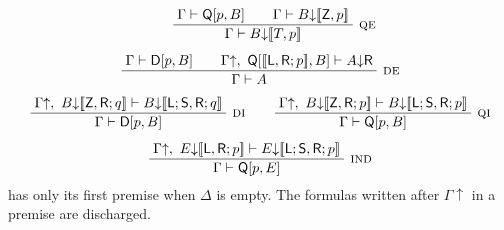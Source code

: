 \begin{definition}
\begin{gather*}
 \qquad
 \infrule{\Gamma\proves\mathsf Q[p,B]\qquad
          \Gamma\proves B{\downarrow}\llbracket\mathsf Z,p\rrbracket}
         {\Gamma\proves B{\downarrow}\llbracket T,p\rrbracket}\ \rulename{QE}
 \\[1.2ex]
 \infrule{\Gamma\proves\mathsf D[p,B]\qquad
   \Gamma{\uparrow},\ \mathsf Q[\llbracket\mathsf L,\mathsf R;p\rrbracket,B]
   \proves A{\downarrow}\mathsf R}
   {\Gamma\proves A}\ \rulename{DE}
 \\[1.2ex]
 \infrule{\Gamma{\uparrow},\ B{\downarrow}\llbracket\mathsf Z,\mathsf R;q\rrbracket
   \proves B{\downarrow}\llbracket\mathsf L;\mathsf S,\mathsf R;q\rrbracket}
   {\Gamma\proves\mathsf D[p,B]}\ \rulename{DI}
 \qquad
 \infrule{\Gamma{\uparrow},\ B{\downarrow}\llbracket\mathsf Z,\mathsf R;p\rrbracket
   \proves B{\downarrow}\llbracket\mathsf L;\mathsf S,\mathsf R;p\rrbracket}
   {\Gamma\proves\mathsf Q[p,B]}\ \rulename{QI}
 \\[1.2ex]
 \infrule{\Gamma{\uparrow},\ E{\downarrow}\llbracket\mathsf L,\mathsf R;p\rrbracket
   \proves E{\downarrow}\llbracket\mathsf L;\mathsf S,\mathsf R;p\rrbracket}
   {\Gamma\proves\mathsf Q[p,E]}\ \rulename{Ind}
\end{gather*}
 has only its first premise when $\Delta$ is empty.  The
formulas written after $\Gamma{\uparrow}$ in a premise are discharged.
\end{definition}

